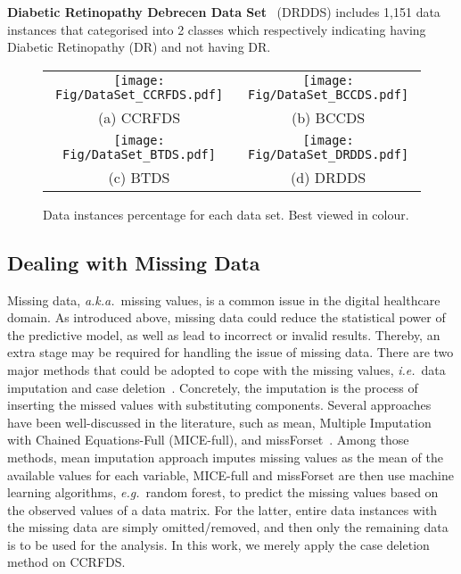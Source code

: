 \documentclass{article}
\newcommand{\zzie}{\emph{i.e.}~}
\newcommand{\zzeg}{\emph{e.g.}~}
\newcommand{\zzaka}{\emph{a.k.a.}~}
\newcommand*{\1}{\textcolor{red}}
\begin{document}
\textbf{Diabetic Retinopathy Debrecen Data Set}~\cite{DiabeticRetinopathyDebrecenDS2014} (DRDDS) includes 1,151 data instances that categorised into 2 classes which respectively indicating having Diabetic Retinopathy (DR) and not having DR.
\begin{figure}[!ht]
	\setlength{\tabcolsep}{-8pt}
	\centering
	\begin{tabular}{cc}
		\hspace{-0.3em}\texttt{[image: Fig/DataSet\_CCRFDS.pdf]} & \texttt{[image: Fig/DataSet\_BCCDS.pdf]}\\
		(a) CCRFDS & (b) BCCDS\\
		\hspace{-0.3em}\texttt{[image: Fig/DataSet\_BTDS.pdf]} & \texttt{[image: Fig/DataSet\_DRDDS.pdf]}\\
		(c) BTDS & (d) DRDDS
	\end{tabular}
	\caption{Data instances percentage for each data set. Best viewed in colour.}
	\label{fig:DS}
\end{figure}

\subsection{Dealing with Missing Data}\label{sec:missingvalues}
Missing data, \zzaka missing values, is a common issue in the digital healthcare domain. As introduced above, missing data could reduce the statistical power of the predictive model, as well as lead to incorrect or invalid results. Thereby, an extra stage may be required for handling the issue of missing data. There are two major methods that could be adopted to cope with the missing values, \zzie data imputation and case deletion~\cite{kang2013prevention}. Concretely, the imputation is the process of inserting the missed values with substituting components. Several approaches have been well-discussed in the literature, such as mean, Multiple Imputation with Chained Equations-Full (MICE-full), and missForset~\cite{luo2016using}. Among those methods, mean imputation approach imputes missing values as the mean of the available values for each variable, MICE-full and missForset are then use machine learning algorithms, \zzeg random forest, to predict the missing values based on the observed values of a data matrix. For the latter, entire data instances with the missing data are simply omitted/removed, and then only the remaining data is to be used for the analysis. In this work, we merely apply the case deletion method on CCRFDS.
\end{document}
